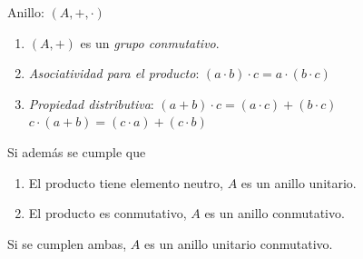 \documentclass[10pt,t]{beamer}
\begin{document}
\begin{frame}%
    \vspace{-0.5em}
    \begin{block}{\centering \large Anillo: $(A,+,\cdot)$}
        \begin{enumerate}[label=\roman*)]
            \item $(A, +)$ es un \textit{grupo conmutativo}.
            \item \textit{Asociatividad para el producto}: \hspace{0.5em}
                $ (a \cdot b) \cdot c = a \cdot (b \cdot c)$
            \item \textit{Propiedad distributiva}:\hspace{4.45em}
                $(a + b) \cdot c = (a \cdot c) + (b \cdot c)$ \\[0.6ex]
                \hspace{14.45em}
                $ c \cdot (a + b) = (c \cdot a) + (c \cdot b)$
        \end{enumerate}
        Si además se cumple que
        \begin{enumerate}[label=\roman*), start=4]
            \item El producto tiene elemento neutro, $A$ es un \alert{anillo unitario}.
            \item El producto es conmutativo, $A$ es un \alert{anillo conmutativo}.
        \end{enumerate}
            Si se cumplen ambas, $A$ es un \alert{anillo unitario conmutativo}.
    \end{block} 
    \vspace{-0.5em}

\end{frame}
\end{document}
